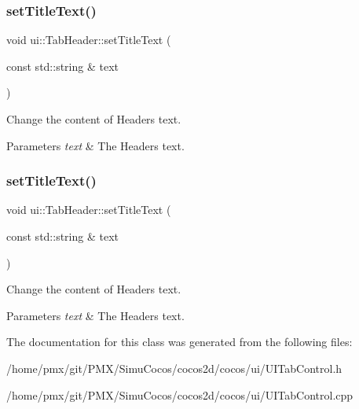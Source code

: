 \subsubsection{\texorpdfstring{set\+Title\+Text()}{setTitleText()}\hspace{0.1cm}{\footnotesize\ttfamily [1/2]}}
{\footnotesize\ttfamily void ui\+::\+Tab\+Header\+::set\+Title\+Text (\begin{DoxyParamCaption}\item[{const std\+::string \&}]{text }\end{DoxyParamCaption})}

Change the content of Header\textquotesingle{}s text. 
\begin{DoxyParams}{Parameters}
{\em text} & The Header\textquotesingle{}s text. \\
\hline
\end{DoxyParams}
\mbox{\label{classui_1_1TabHeader_a48acc817abd1b8ea56653f3e3d810c9e}} 
\subsubsection{\texorpdfstring{set\+Title\+Text()}{setTitleText()}\hspace{0.1cm}{\footnotesize\ttfamily [2/2]}}
{\footnotesize\ttfamily void ui\+::\+Tab\+Header\+::set\+Title\+Text (\begin{DoxyParamCaption}\item[{const std\+::string \&}]{text }\end{DoxyParamCaption})}

Change the content of Header\textquotesingle{}s text. 
\begin{DoxyParams}{Parameters}
{\em text} & The Header\textquotesingle{}s text. \\
\hline
\end{DoxyParams}


The documentation for this class was generated from the following files\+:\begin{DoxyCompactItemize}
\item 
/home/pmx/git/\+P\+M\+X/\+Simu\+Cocos/cocos2d/cocos/ui/U\+I\+Tab\+Control.\+h\item 
/home/pmx/git/\+P\+M\+X/\+Simu\+Cocos/cocos2d/cocos/ui/U\+I\+Tab\+Control.\+cpp\end{DoxyCompactItemize}
